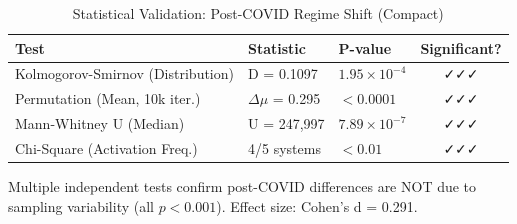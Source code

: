 
\begin{table}[htbp]
\centering
\caption{Statistical Validation: Post-COVID Regime Shift (Compact)}
\label{tab:statistical_tests_compact}
\small
\begin{tabular}{@{}lllc@{}}
\toprule
\textbf{Test} & \textbf{Statistic} & \textbf{P-value} & \textbf{Significant?} \\
\midrule
Kolmogorov-Smirnov (Distribution) & D = 0.1097 & $1.95\times10^{-4}$ & ✓✓✓ \\
Permutation (Mean, 10k iter.) & $\Delta\mu$ = 0.295 & $<0.0001$ & ✓✓✓ \\
Mann-Whitney U (Median) & U = 247,997 & $7.89\times10^{-7}$ & ✓✓✓ \\
Chi-Square (Activation Freq.) & 4/5 systems & $<0.01$ & ✓✓✓ \\
\bottomrule
\end{tabular}
\vspace{0.5em}
\begin{flushleft}
\footnotesize
Multiple independent tests confirm post-COVID differences are NOT due to sampling 
variability (all $p < 0.001$). Effect size: Cohen's d = 0.291.
\end{flushleft}
\end{table}


